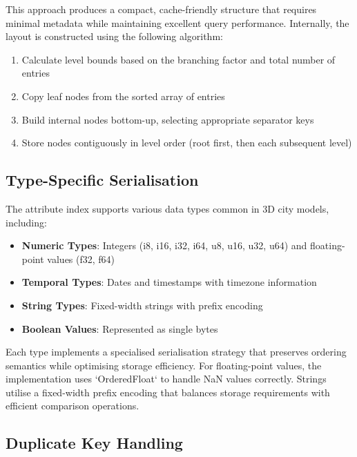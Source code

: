 This approach produces a compact, cache-friendly structure that requires minimal metadata while maintaining excellent query performance. Internally, the layout is constructed using the following algorithm:

\begin{enumerate}
    \item Calculate level bounds based on the branching factor and total number of entries
    \item Copy leaf nodes from the sorted array of entries
    \item Build internal nodes bottom-up, selecting appropriate separator keys
    \item Store nodes contiguously in level order (root first, then each subsequent level)
\end{enumerate}

\subsection{Type-Specific Serialisation}
\label{methodology:attribute_index:type_specific_serialisation}

The attribute index supports various data types common in 3D city models, including:

\begin{itemize}
    \item \textbf{Numeric Types}: Integers (i8, i16, i32, i64, u8, u16, u32, u64) and floating-point values (f32, f64)
    \item \textbf{Temporal Types}: Dates and timestamps with timezone information
    \item \textbf{String Types}: Fixed-width strings with prefix encoding
    \item \textbf{Boolean Values}: Represented as single bytes
\end{itemize}

Each type implements a specialised serialisation strategy that preserves ordering semantics while optimising storage efficiency. For floating-point values, the implementation uses `OrderedFloat` to handle NaN values correctly. Strings utilise a fixed-width prefix encoding that balances storage requirements with efficient comparison operations.

\subsection{Duplicate Key Handling}
\label{methodology:attribute_index:duplicate_key_handling}

